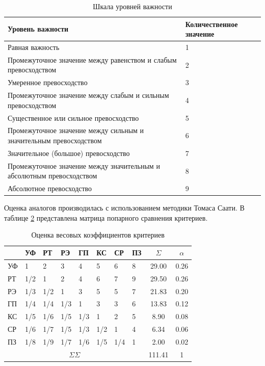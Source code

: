 	\begin{table}[h!]
		\begin{raggedright}
			\caption{Шкала уровней важности}
			\begin{tabular}{ | p{} | p{} | }
				\hline
				Уровень важности & Количественное значение \\
				\hline
				Равная важность & 1 \\
				\hline
				Промежуточное значение между равенством и слабым превосходством & 2 \\
				\hline
				Умеренное превосходство & 3 \\
				\hline
				Промежуточное значение между слабым и сильным превосходством & 4 \\
				\hline
				Существенное или сильное превосходство & 5 \\
				\hline
				Промежуточное значение между сильным и значительным превосходством & 6 \\
				\hline
				Значительное (большое) превосходство & 7 \\
				\hline
				Промежуточное значение между значительным и абсолютным превосходством & 8 \\
				\hline
				Абсолютное превосходство & 9 \\
				\hline
			\end{tabular}
			\label{table:scale}
		\end{raggedright}
	\end{table}

	\pagebreak

	Оценка аналогов производилась с использованием методики Томаса Саати. В таблице \ref{table:est} представлена матрица попарного сравнения критериев.

	\begin{table}
		\begin{raggedright}
			\caption{Оценка весовых коэффициентов критериев}
			\begin{tabular}{ | p{} | l | l | l | l | l | l | l | c | c | }	
				\hline
				   & УФ & РТ & РЭ & ГП & КС & СР & ПЗ & $\Sigma$ & $\alpha$ \\
				\hline
				УФ &1   &2   &3   &4   &5   &6   &8   &29.00 &0.26 \\
				\hline
				РТ &1/2 &1   &2   &4   &6   &7   &9   &29.50 &0.26 \\
				\hline
				РЭ &1/3 &1/2 &1   &3   &5   &5   &7   &21.83 &0.20 \\
				\hline
				ГП &1/4 &1/4 &1/3 &1 &  3   &3   &6   &13.83 &0.12 \\
				\hline
				КС &1/5 &1/6 &1/5 &1/3 &1   &2   &5   &8.90  &0.08 \\
				\hline
				СР &1/6 &1/7 &1/5 &1/3 &1/2 &1   &4   &6.34  &0.06 \\
				\hline
				ПЗ &1/8 &1/9 &1/7 &1/6 &1/5 &1/4 &1   &2.00  &0.02 \\
				\hline
				\hline 
				\multicolumn{8}{|c|}{$\Sigma\Sigma$}           &111.41 &1   \\
				\hline
			\end{tabular}
			\label{table:est}
		\end{raggedright}
	\end{table}

